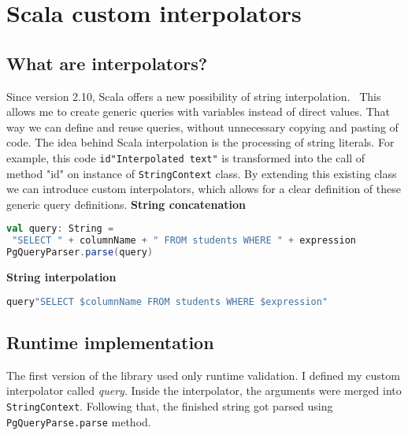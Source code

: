 \section{Scala custom interpolators}
\subsection{What are interpolators?}
Since version 2.10, Scala offers a new possibility of string interpolation.~\cite{String interpolation} This allows me to create generic queries with variables instead of direct values. That way we can define and reuse queries, without unnecessary copying and pasting of code. The idea behind Scala interpolation is the processing of string literals. For example, this code  \verb|id"Interpolated text"| is transformed into the call of method "id" on instance of \texttt{StringContext} class. By extending this existing class we can introduce custom interpolators, which allows for a clear definition of these generic query definitions.
\bigskip
\newline
\textbf{String concatenation}
\begin{lstlisting}[language=scala, basicstyle=\ttfamily, showstringspaces=false]
val query: String = 
 "SELECT " + columnName + " FROM students WHERE " + expression
PgQueryParser.parse(query)
\end{lstlisting}
\bigskip
\textbf{String interpolation}
\begin{lstlisting}[language=scala, basicstyle=\ttfamily, showstringspaces=false]
query"SELECT $columnName FROM students WHERE $expression"
\end{lstlisting}

\subsection{Runtime implementation}
The first version of the library used only runtime validation. I defined my custom interpolator called \textit{query}. Inside the interpolator, the arguments were merged into \texttt{StringContext}. Following that, the finished string got parsed using \texttt{PgQueryParse.parse} method.
